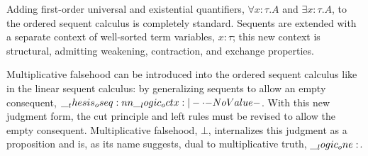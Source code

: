 Adding first-order universal and existential quantifiers, $\forall x{:}\tau.A$ and $\exists x{:}\tau.A$, to the ordered sequent calculus is completely standard.
Sequents are extended with a separate context of well-sorted term variables, $x{:}\tau$; this new context is structural, admitting weakening, contraction, and exchange properties.



Multiplicative falsehood can be introduced into
the ordered sequent calculus like in the linear sequent calculus\autocite{Chang+:CMU03}:
by generalizing %
sequents to %
allow
an empty consequent, $\oseq{\octx |- \cdot}$.
With this new judgment form, the cut principle and left rules must be revised to allow the empty consequent.
% 
Multiplicative falsehood, $\bot$, internalizes this judgment as a proposition and is, as its name suggests, dual to multiplicative truth, $\__logic_one:$.

